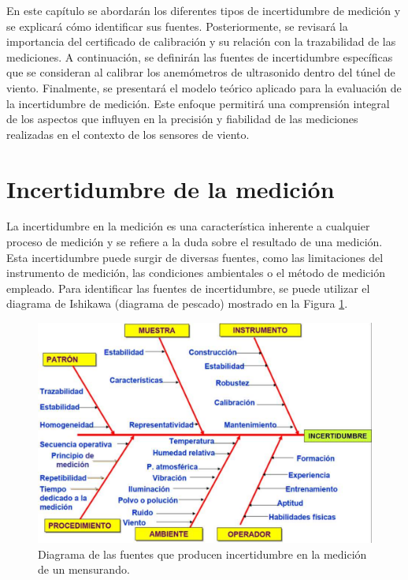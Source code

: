 En este capítulo se abordarán los diferentes tipos de incertidumbre de medición y se explicará cómo identificar sus fuentes. Posteriormente, se revisará la importancia del certificado de calibración y su relación con la trazabilidad de las mediciones. A continuación, se definirán las fuentes de incertidumbre específicas que se consideran al calibrar los anemómetros de ultrasonido dentro del túnel de viento. Finalmente, se presentará el modelo teórico aplicado para la evaluación de la incertidumbre de medición. Este enfoque permitirá una comprensión integral de los aspectos que influyen en la precisión y fiabilidad de las mediciones realizadas en el contexto de los sensores de viento.

\section{Incertidumbre de la medición}\label{sec:tipos_incertidumbre}

La incertidumbre en la medición es una característica inherente a cualquier proceso de medición y se refiere a la duda sobre el resultado de una medición. Esta incertidumbre puede surgir de diversas fuentes, como las limitaciones del instrumento de medición, las condiciones ambientales o el método de medición empleado. Para identificar las fuentes de incertidumbre, se puede utilizar el diagrama de Ishikawa (diagrama de pescado) mostrado en la Figura \ref{fig:diagramaPescado}.

\begin{figure}[H]
    \centering
    \includegraphics[width=0.8\linewidth]{Figuras/calculoIncertidumbre/diagramaPescado.png}
    \caption{Diagrama de las fuentes que producen incertidumbre en la medición de un mensurando.}
    \label{fig:diagramaPescado}
\end{figure}

